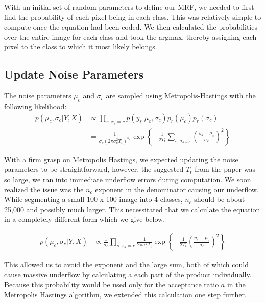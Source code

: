 \documentclass[11pt]{article}
\begin{document}
With an initial set of random parameters to define our MRF, we needed to first find the probability of each pixel being in each class.
This was relatively simple to compute once the equation had been coded.
We then calculated the probabilities over the entire image for each class and took the argmax, thereby assigning each pixel to the class to which it most likely belongs.


\subsection{Update Noise Parameters}
The noise parameters $\mu_{c}$ and $\sigma_{c}$ are sampled using Metropolis-Hastings with the following likelihood:
\begin{equation}
\begin{aligned}
p\left(\mu_{c}, \sigma_{c} | Y, X\right) & \propto \prod_{s: x_{s}=c} p\left(y_{s} | \mu_{c}, \sigma_{c}\right) p_{r}\left(\mu_{c}\right) p_{r}\left(\sigma_{c}\right) \\
&=\frac{1}{\sigma_{c}\left(2 \pi \sigma_{c}^{2} T_{t}\right)^{n_{c}}} \exp \left\{-\frac{1}{2 T_{t}} \sum_{s: a_{s=c}}\left(\frac{y_{s}-\mu_{c}}{\sigma_{c}}\right)^{2}\right\}
\end{aligned}
\end{equation}

With a firm grasp on Metropolis Hastings, we expected updating the noise parameters to be straightforward, however, the suggested $T_{t}$ from the paper was so large, we ran into immediate underflow errors during computation.
We soon realized the issue was the $n_{c}$ exponent in the denominator causing our underflow.
While segmenting a small 100 x 100 image into 4 classes, $n_{c}$ should be about 25,000 and possibly much larger.
This necessitated that we calculate the equation in a completely different form which we give below.

\begin{equation}
\begin{aligned}
p\left(\mu_{c}, \sigma_{c} | Y, X\right) & \propto \frac{1}{\sigma_{c}}\prod_{s: x_{s}=c} \frac{1}{2 \pi \sigma_{c}^{2} T_{t}} \exp \left\{-\frac{1}{2 T_{t}} \left(\frac{y_{s}-\mu_{c}}{\sigma_{c}}\right)^{2} \right\}
\end{aligned}
\end{equation}

This allowed us to avoid the exponent and the large sum, both of which could cause massive underflow by calculating a each part of the product individually.
Because this probability would be used only for the acceptance ratio $a$ in the Metropolis Hastings algorithm, we extended this calculation one step further.
\end{document}
